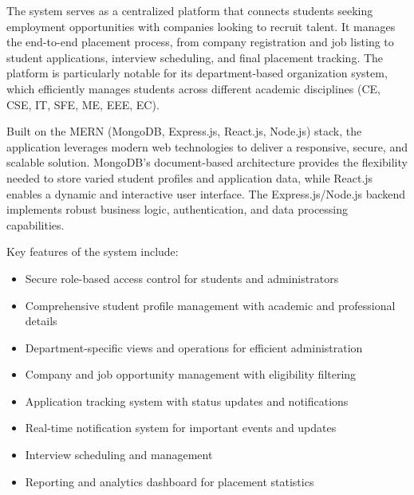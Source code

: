 \documentclass[12pt,a4paper]{report}
\begin{document}
The system serves as a centralized platform that connects students seeking employment opportunities with companies looking to recruit talent. It manages the end-to-end placement process, from company registration and job listing to student applications, interview scheduling, and final placement tracking. The platform is particularly notable for its department-based organization system, which efficiently manages students across different academic disciplines (CE, CSE, IT, SFE, ME, EEE, EC).

Built on the MERN (MongoDB, Express.js, React.js, Node.js) stack, the application leverages modern web technologies to deliver a responsive, secure, and scalable solution. MongoDB's document-based architecture provides the flexibility needed to store varied student profiles and application data, while React.js enables a dynamic and interactive user interface. The Express.js/Node.js backend implements robust business logic, authentication, and data processing capabilities.

Key features of the system include:
\begin{itemize}
    \item Secure role-based access control for students and administrators
    \item Comprehensive student profile management with academic and professional details
    \item Department-specific views and operations for efficient administration
    \item Company and job opportunity management with eligibility filtering
    \item Application tracking system with status updates and notifications
    \item Real-time notification system for important events and updates
    \item Interview scheduling and management
    \item Reporting and analytics dashboard for placement statistics
\end{itemize}
\end{document}

